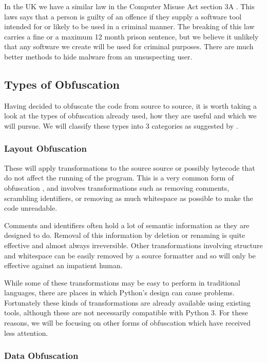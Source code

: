 \documentclass[twoside,a4paper]{report}
\begin{document}
In the UK we have a similar law in the Computer Misuse Act section 3A \cite{compmisuse}. This laws says that a person is guilty of an offence
if they supply a software tool intended for or likely to be used in a criminal manner. The breaking of this law carries a fine or a maximum 12 month
prison sentence, but we believe it unlikely that any software we create will be used for criminal purposes. There are
much better methods to hide malware from an unsuspecting user.

\subsection{Types of Obfuscation}

Having decided to obfuscate the code from source to source, it is worth taking a look at the types of
obfuscation already used, how they are useful and which we will pursue. We will classify these types into 3 categories
as suggested by \cite[p10]{desevobf}.

\subsubsection{Layout Obfuscation}

These will apply transformations to the source source or possibly bytecode that do not affect the running of the
program. This is a very common form of obfuscation \cite[p10]{desevobf}, and involves transformations such as removing comments,
scrambling identifiers, or removing as much whitespace as possible to make the code unreadable.

Comments and identifiers often hold a lot of semantic information as they are designed to do.
Removal of this information by deletion or renaming is quite effective and almost always irreversible. Other transformations involving
structure and whitespace
can be easily removed by a source formatter and so will only be effective against an impatient human.

While some of these transformations may be easy to perform in traditional languages, there are places in which
Python's design can cause problems. Fortunately these kinds of transformations are already available using existing
tools, although these are not necessarily compatible with Python 3. For these reasons, we will be focusing on other forms of
obfuscation which have received less attention.

\subsubsection{Data Obfuscation}
\end{document}
